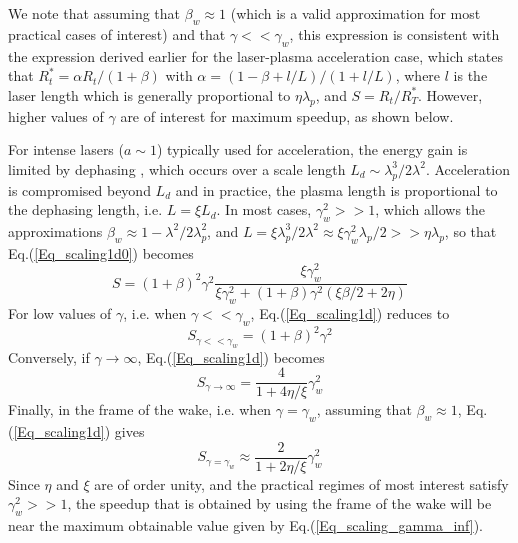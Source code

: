 \documentclass[]{report}
\begin{document}
We note that assuming that $\beta_w\approx1$ (which is a valid approximation for most practical cases of interest) and that $\gamma<<\gamma_w$, this expression is consistent with the expression derived earlier \cite{Vayprl07} for the laser-plasma acceleration case, which states that $R_t^*=\alpha R_t/\left(1+\beta\right)$ with $\alpha=\left(1-\beta+l/L\right)/\left(1+l/L\right)$, where $l$ is the laser length which is generally proportional to $\eta \lambda_p$, and $S=R_t/R_T^*$. However, higher values of $\gamma$ are of interest for maximum speedup, as shown below.

For intense lasers ($a\sim 1$) typically used for acceleration, the energy gain is limited by dephasing \cite{Schroederprl2011}, which occurs over a scale length $L_d \sim \lambda_p^3/2\lambda^2$.  
Acceleration is compromised beyond $L_d$ and in practice, the plasma length is proportional to the dephasing length, i.e. $L= \xi L_d$. In most cases, $\gamma_w^2>>1$, which allows the approximations $\beta_w\approx1-\lambda^2/2\lambda_p^2$, and $L=\xi \lambda_p^3/2\lambda^2\approx \xi \gamma_w^2 \lambda_p/2>>\eta \lambda_p$, so that Eq.(\ref{Eq_scaling1d0}) becomes
%
\begin{equation}
S=\left(1+\beta\right)^2\gamma^2\frac{\xi\gamma_w^2}{\xi\gamma_w^2+\left(1+\beta\right)\gamma^2\left(\xi\beta/2+2\eta\right)}
\label{Eq_scaling1d}
\end{equation}
%
For low values of $\gamma$, i.e. when $\gamma<<\gamma_w$, Eq.(\ref{Eq_scaling1d}) reduces to
%
\begin{equation}
S_{\gamma<<\gamma_w}=\left(1+\beta\right)^2\gamma^2
\label{Eq_scaling1d_simpl2}
\end{equation}
%
Conversely, if $\gamma\rightarrow\infty$, Eq.(\ref{Eq_scaling1d}) becomes
%
\begin{equation}
S_{\gamma\rightarrow\infty}=\frac{4}{1+4\eta/\xi}\gamma_w^2
\label{Eq_scaling_gamma_inf}
\end{equation}
%
Finally, in the frame of the wake, i.e. when $\gamma=\gamma_w$, assuming that $\beta_w\approx1$, Eq.(\ref{Eq_scaling1d}) gives
%
\begin{equation}
S_{\gamma=\gamma_w}\approx\frac{2}{1+2\eta/\xi}\gamma_w^2
\label{Eq_scaling_gamma_wake}
\end{equation}
Since $\eta$ and $\xi$ are of order unity, and the practical regimes of most interest satisfy $\gamma_w^2>>1$, the speedup that is obtained by using the frame of the wake will be near the maximum obtainable value given by Eq.(\ref{Eq_scaling_gamma_inf}).
\end{document}
